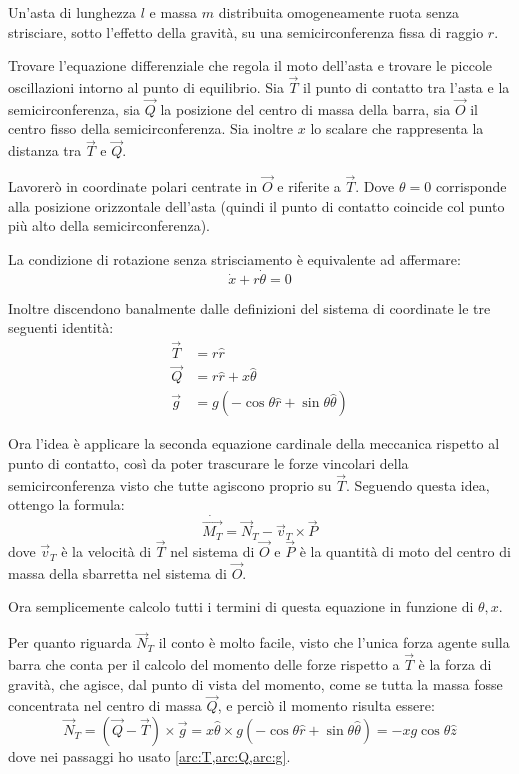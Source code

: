 \documentclass[../main.tex]{subfiles}
\begin{document}

\textex
Un'asta di lunghezza $l$ e massa $m$ distribuita omogeneamente ruota senza strisciare, sotto l'effetto della gravità, su una semicirconferenza fissa di raggio $r$.

Trovare l'equazione differenziale che regola il moto dell'asta e trovare le piccole oscillazioni intorno al punto di equilibrio.
\solution
Sia $\vec T$ il punto di contatto tra l'asta e la semicirconferenza, sia $\vec Q$ la posizione del centro di massa della barra, sia $\vec O$ il centro fisso della semicirconferenza. Sia inoltre $x$ lo scalare che rappresenta la distanza tra $\vec T$ e $\vec Q$.

Lavorerò in coordinate polari centrate in $\vec O$ e riferite a $\vec T$. Dove $\theta=0$ corrisponde alla posizione orizzontale dell'asta (quindi il punto di contatto coincide col punto più alto della semicirconferenza).

La condizione di rotazione senza strisciamento è equivalente ad affermare:
\begin{equation}\label{arc:NoStrisciamento}
	\dot x + r\dot \theta = 0
\end{equation}

Inoltre discendono banalmente dalle definizioni del sistema di coordinate le tre seguenti identità:
\begin{align}
	\vec T &=r\hat r \label{arc:T}\\
	\vec Q &=r\hat r+x\hat{\theta} \label{arc:Q}\\
	\vec g &=g\left(-\cos\theta\hat r + \sin\theta \hat{\theta} \label{arc:g}\right)
\end{align}

Ora l'idea è applicare la seconda equazione cardinale della meccanica rispetto al punto di contatto, così da poter trascurare le forze vincolari della semicirconferenza visto che tutte agiscono proprio su $\vec T$.
Seguendo questa idea, ottengo la formula:
\begin{equation}\label{arc:Cardine}
	\dot{\overrightarrow{M_T}}=\vec N_T - \vec v_T\times \vec P
\end{equation}
dove $\vec v_T$ è la velocità di $\vec T$ nel sistema di $\vec O$ e $\vec P$ è la quantità di moto del centro di massa della sbarretta nel sistema di $\vec O$.

Ora semplicemente calcolo tutti i termini di questa equazione in funzione di $\theta,x$.

Per quanto riguarda $\vec N_T$ il conto è molto facile, visto che l'unica forza agente sulla barra che conta per il calcolo del momento delle forze rispetto a $\vec T$ è la forza di gravità, che agisce, dal punto di vista del momento, come se tutta la massa fosse concentrata nel centro di massa $\vec Q$, e perciò il momento risulta essere:
\begin{equation} \label{arc:MomentoDelleForze}
	\vec N_T = (\vec Q-\vec T)\times \vec g = x\hat{\theta}\times g\left( -\cos\theta\hat r+\sin\theta \hat\theta \right)
	=-xg\cos\theta\hat z
\end{equation}
dove nei passaggi ho usato \cref{arc:T,arc:Q,arc:g}.
\end{document}
